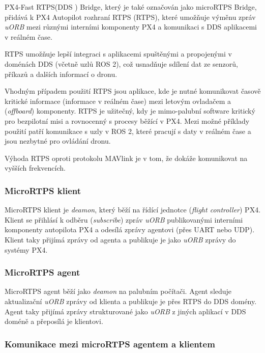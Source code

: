 PX4-Fast RTPS(\acs{DDS} ) Bridge, který je také označován jako microRTPS Bridge, přidává k PX4 Autopilot rozhraní \acs{RTPS} (\acl{RTPS}), které umožňuje výměnu zpráv \textit{uORB} mezi různými interními komponenty PX4 a  komunikaci s \acs{DDS} aplikacemi v reálném čase.

\acs{RTPS} umožňuje lepší integraci s aplikacemi spuštěnými a propojenými v doménách \acs{DDS} (včetně uzlů ROS 2), což usnadňuje sdílení dat ze senzorů, příkazů a dalších informací o dronu.

Vhodným případem použití \acs{RTPS} jsou aplikace, kde je nutné komunikovat časově kritické informace (informace v reálném čase) mezi letovým ovladačem a  (\textit{offboard}) komponenty. \acs{RTPS} je užitečný, kdy je mimo-palubní software kritický pro bezpilotní misi a rovnocenný s procesy běžící v PX4. Mezi možné příklady použití patří komunikace s uzly v ROS 2, které pracují s daty v reálném čase a jsou nezbytné pro ovládání dronu.

Výhoda \acs{RTPS} oproti protokolu MAVlink je v tom, že dokáže komunikovat na vyšších frekvencích. \cite{PX4docs}

\subsubsection{MicroRTPS klient}

MicroRTPS klient je \textit{deamon}, který běží na řídící jednotce (\textit{flight controller}) PX4. Klient se přihlásí k odběru (\textit{subscribe}) zpráv \textit{uORB} publikovanými interními komponenty autopilota PX4 a odesílá zprávy agentovi (přes UART nebo UDP). Klient taky přijímá zprávy od agenta a publikuje je jako \textit{uORB} zprávy do systémy PX4.

\subsubsection{MicroRTPS agent}

MicroRTPS agent běží jako \textit{deamon} na palubním počítači. Agent sleduje aktualizační \textit{uORB} zprávy od klienta a publikuje je přes \acs{RTPS} do \acs{DDS} domény. Agent taky přijímá zprávy strukturované jako \textit{uORB} z jiných aplikací v \acs{DDS} doméně a přeposílá je klientovi.

\subsubsection{Komunikace mezi microRTPS agentem a klientem}

